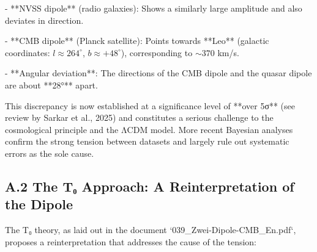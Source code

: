 	- **NVSS dipole** (radio galaxies): Shows a similarly large amplitude and also deviates in direction.
	
	- **CMB dipole** (Planck satellite): Points towards **Leo** (galactic coordinates: $l \approx 264^\circ$, $b \approx +48^\circ$), corresponding to $\sim 370$ km/s.
	
	- **Angular deviation**: The directions of the CMB dipole and the quasar dipole are about **28°** apart.
	
	This discrepancy is now established at a significance level of **over 5σ** (see review by Sarkar et al., 2025) and constitutes a serious challenge to the cosmological principle and the ΛCDM model. More recent Bayesian analyses confirm the strong tension between datasets and largely rule out systematic errors as the sole cause.
	
	\subsection*{A.2 The T₀ Approach: A Reinterpretation of the Dipole}
	
	The T₀ theory, as laid out in the document `039\_Zwei-Dipole-CMB\_En.pdf`, proposes a reinterpretation that addresses the cause of the tension:
	
